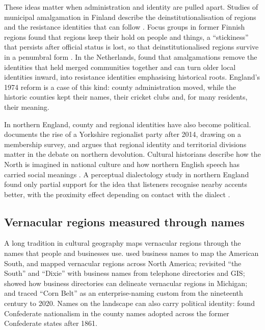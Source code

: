 \documentclass[11pt,a4paper]{article}
\begin{document}
These ideas matter when administration and identity are pulled apart. Studies of municipal amalgamation in Finland describe the deinstitutionalisation of regions and the resistance identities that can follow \citep{zimmerbauer2013}. Focus groups in former Finnish regions found that regions keep their hold on people and things, a ``stickiness'' that persists after official status is lost, so that deinstitutionalised regions survive in a penumbral form \citep{zimmerbauer2017}. In the Netherlands, \citet{terlouw2016,terlouw2018} found that amalgamations remove the identities that held merged communities together and can turn older local identities inward, into resistance identities emphasising historical roots. England's 1974 reform is a case of this kind: county administration moved, while the historic counties kept their names, their cricket clubs and, for many residents, their meaning.

In northern England, county and regional identities have also become political. \citet{giovannini2016} documents the rise of a Yorkshire regionalist party after 2014, drawing on a membership survey, and argues that regional identity and territorial divisions matter in the debate on northern devolution. Cultural historians describe how the North is imagined in national culture \citep{russell2004} and how northern English speech has carried social meanings \citep{wales2006}. A perceptual dialectology study in northern England found only partial support for the idea that listeners recognise nearby accents better, with the proximity effect depending on contact with the dialect \citep{leach2016}.

\subsection{Vernacular regions measured through names}
A long tradition in cultural geography maps vernacular regions through the names that people and businesses use. \citet{reed1976} used business names to map the American South, and \citet{zelinsky1980} mapped vernacular regions across North America; \citet{ambinakudige2009} revisited ``the South'' and ``Dixie'' with business names from telephone directories and GIS; \citet{liesch2015} showed how business directories can delineate vernacular regions in Michigan; and \citet{sublett2021} traced ``Corn Belt'' as an enterprise-naming custom from the nineteenth century to 2020. Names on the landscape can also carry political identity: \citet{gulley1990} found Confederate nationalism in the county names adopted across the former Confederate states after 1861.
\end{document}

